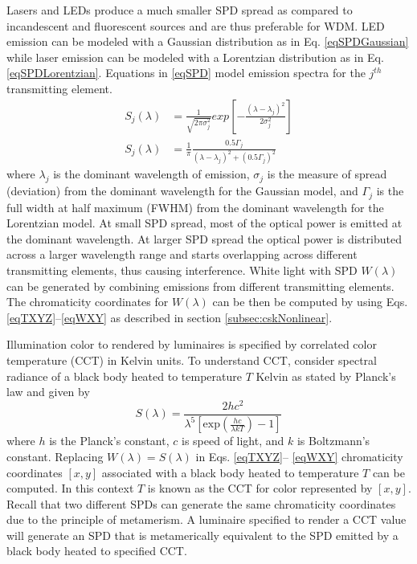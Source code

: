 Lasers and LEDs produce a much smaller SPD spread as compared to incandescent and fluorescent sources and are thus preferable for WDM. LED emission can be modeled with a Gaussian distribution as in Eq. \eqref{eqSPDGaussian} while laser emission can be modeled with a Lorentzian distribution as in Eq. \eqref{eqSPDLorentzian}. Equations in \eqref{eqSPD} model emission spectra for the $j^{th}$ transmitting element.
\begin{subequations}
\begin{align}
S_j(\lambda) &= \frac{1}{\sqrt{2\pi\sigma_j^2}}exp\left[-\frac{(\lambda-\lambda_j)^2}{2\sigma_j^2}\right]\label{eqSPDGaussian}\\
S_j(\lambda) &= \frac{1}{\pi}\frac{0.5\Gamma_j}{(\lambda-\lambda_j)^2 + (0.5\Gamma_j)^2}\label{eqSPDLorentzian}
\end{align}
\label{eqSPD}
\end{subequations}
where $\lambda_j$ is the dominant wavelength of emission, $\sigma_j$ is the measure of spread (deviation) from the dominant wavelength for the Gaussian model, and $\Gamma_j$ is the full width at half maximum (FWHM) from the dominant wavelength for the Lorentzian model. At small SPD spread, most of the optical power is emitted at the dominant wavelength. At larger SPD spread the optical power is distributed across a larger wavelength range and starts overlapping across different transmitting elements, thus causing interference. White light with SPD $W(\lambda)$ can be generated by combining emissions from different transmitting elements. The chromaticity coordinates for $W(\lambda)$ can be then be computed by using Eqs. \eqref{eqTXYZ}--\eqref{eqWXY} as described in section \ref{subsec:cskNonlinear}.

Illumination color to rendered by luminaires is specified by correlated color temperature (CCT) in Kelvin units. To understand CCT, consider spectral radiance of a black body heated to temperature $T$ Kelvin as stated by Planck's law and given by
\begin{equation}
\label{eqPlanck}
	 S(\lambda) = \frac{2hc^2}{\lambda^5\left[\text{exp}\left(\frac{hc}{\lambda kT}\right)-1\right]}
\end{equation}
where $h$ is the Planck's constant, $c$ is speed of light, and $k$ is Boltzmann's constant. Replacing $W(\lambda)=S(\lambda)$ in Eqs. \eqref{eqTXYZ}-- \eqref{eqWXY} chromaticity coordinates $[x,y]$ associated with a black body heated to temperature $T$ can be computed. In this context $T$ is known as the CCT for color represented by $[x,y]$. Recall that two different SPDs can generate the same chromaticity coordinates due to the principle of metamerism. A luminaire specified to render a CCT value will generate an SPD that is metamerically equivalent to the SPD emitted by a black body heated to specified CCT.

